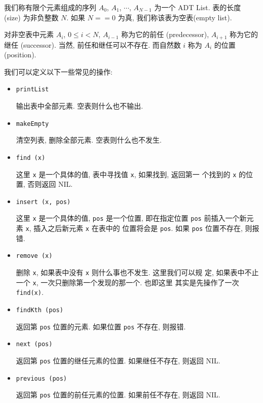 \documentclass[a4paper]{ctexart}
\theoremstyle{definition}
\theoremstyle{definition}
\begin{document}
我们称有限个元素组成的序列 $A_0$, $A_1$, $\cdots$, $A_{N - 1}$ 为一个 ADT List.
表的长度 (size) 为非负整数 $N$. 如果 $N == 0$ 为真, 我们称该表为空表(empty list).

对非空表中元素 $A_i$, $0 \leq i < N$, $A_{i - 1}$ 称为它的前任 (predecessor),
$A_{i + 1}$ 称为它的继任 (successor). 当然, 前任和继任可以不存在. 而自然数 $i$ 称为
$A_i$ 的位置 (position).

我们可以定义以下一些常见的操作:
\begin{itemize}
\item
\begin{verbatim}
printList
\end{verbatim}
输出表中全部元素. 空表则什么也不输出.

\item
\begin{verbatim}
makeEmpty
\end{verbatim}
清空列表, 删除全部元素. 空表则什么也不发生. 

\item
\begin{verbatim}
find (x)
\end{verbatim}
这里 \verb|x| 是一个具体的值, 表中寻找值 \verb|x|, 如果找到, 返回第一
个找到的 \verb|x| 的位置, 否则返回 NIL. 

\item 
\begin{verbatim}
insert (x, pos)
\end{verbatim}
这里 \verb|x| 是一个具体的值, \verb|pos| 是一个位置, 即在指定位置
\verb|pos| 前插入一个新元素 \verb|x|, 插入之后新元素 \verb|x| 在表中的
位置将会是 \verb|pos|. 如果 \verb|pos| 位置不存在, 则报错.

\item
\begin{verbatim}
remove (x)
\end{verbatim}
删除 \verb|x|, 如果表中没有 \verb|x| 则什么事也不发生. 这里我们可以规
定, 如果表中不止一个 \verb|x|, 一次只删除第一个发现的那一个. 也即这里
其实是先操作了一次 \verb|find(x)|. 

\item
\begin{verbatim}
findKth (pos)
\end{verbatim}
返回第 \verb|pos| 位置的元素. 如果位置 \verb|pos| 不存在, 则报错.

\item
\begin{verbatim}
next (pos)
\end{verbatim}
返回第 \verb|pos| 位置的继任元素的位置. 如果继任不存在, 则返回 NIL.

\item
\begin{verbatim}
previous (pos)
\end{verbatim}
返回第 \verb|pos| 位置的前任元素的位置. 如果前任不存在, 则返回 NIL.
\end{itemize}
\end{document}
